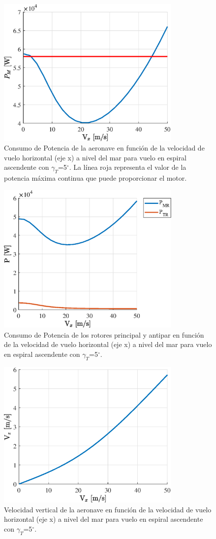 \begin{figure}
	\centering
	\includegraphics[width=90mm]{graficos/PMVE}
	\caption{Consumo de Potencia de la aeronave en función de la velocidad de vuelo horizontal (eje x) a nivel del mar para vuelo en espiral ascendente con $\gamma_T$=5$^\circ$. La línea roja representa el valor de la potencia máxima continua que puede proporcionar el motor.}
	\label{PMVE}
\end{figure}
\begin{figure}
	\centering
	\includegraphics[width=90mm]{graficos/PVE}
	\caption{Consumo de Potencia de los rotores principal y antipar en función de la velocidad de vuelo horizontal (eje x) a nivel del mar para vuelo en espiral ascendente con $\gamma_T$=5$^\circ$.}
	\label{PVE}
\end{figure}
\begin{figure}
	\centering
	\includegraphics[width=90mm]{graficos/VzVE}
	\caption{Velocidad vertical de la aeronave en función de la velocidad de vuelo horizontal (eje x) a nivel del mar para vuelo en espiral ascendente con $\gamma_T$=5$^\circ$.}
	\label{VzVE}
\end{figure}

